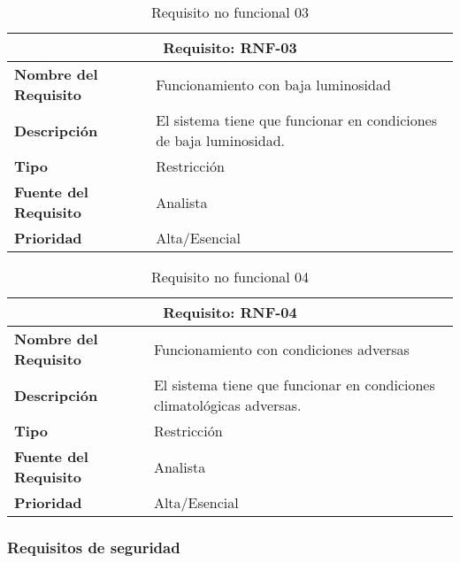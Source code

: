 \begin{table}[H]
\begin{center}
\begin{tabular}{p{} p{7cm}}
\multicolumn{2}{c}{\textbf{Requisito: RNF-03} } \\
\hline \hline
\textbf{Nombre del Requisito} & Funcionamiento con baja luminosidad\\
\hline
\textbf{Descripción} & El sistema tiene que funcionar en condiciones de baja luminosidad.\\
\hline
\textbf{Tipo} & Restricción  \\
\hline
\textbf{Fuente del Requisito} & Analista  \\
\hline
\textbf{Prioridad} & Alta/Esencial \\ \hline
\end{tabular}
\caption{Requisito no funcional 03}
\label{tab:RNF-03}
\end{center}
\end{table}

\begin{table}[H]
\begin{center}
\begin{tabular}{p{} p{7cm}}
\multicolumn{2}{c}{\textbf{Requisito: RNF-04} } \\
\hline \hline
\textbf{Nombre del Requisito} & Funcionamiento con condiciones adversas\\
\hline
\textbf{Descripción} & El sistema tiene que funcionar en condiciones climatológicas adversas.\\
\hline
\textbf{Tipo} & Restricción  \\
\hline
\textbf{Fuente del Requisito} & Analista  \\
\hline
\textbf{Prioridad} & Alta/Esencial \\ \hline
\end{tabular}
\caption{Requisito no funcional 04}
\label{tab:RNF-04}
\end{center}
\end{table}


\subsubsection{Requisitos de seguridad}

